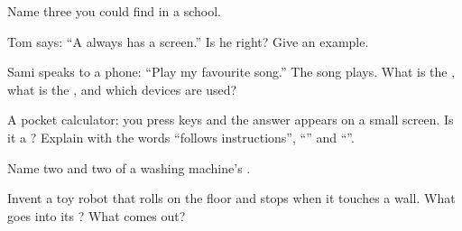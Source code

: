 \begin{exercise}[$\star$]\label{exo:g1:what-is-a-computer:6}
Name three  you could find in a school.
\end{exercise}

\begin{exercise}[$\star$]\label{exo:g1:what-is-a-computer:7}
Tom says: ``A  always has a screen.'' Is he right? Give an example.
\end{exercise}

\begin{exercise}[$\star$]\label{exo:g1:what-is-a-computer:8}
Sami speaks to a phone: ``Play my favourite song.'' The song plays. What is
the , what is the , and which devices are used?
\end{exercise}

\begin{exercise}[$\star\star$]\label{exo:g1:what-is-a-computer:9}
A pocket calculator: you press keys and the answer appears on a small screen.
Is it a ? Explain with the words ``follows instructions'', ``''
and ``''.
\end{exercise}

\begin{exercise}[$\star\star$]\label{exo:g1:what-is-a-computer:10}
Name two  and two  of a washing machine's .
\end{exercise}

\begin{exercise}[$\star\star$]\label{exo:g1:what-is-a-computer:11}
Invent a toy robot that rolls on the floor and stops when it touches a wall.
What goes into its ? What comes out?
\end{exercise}
